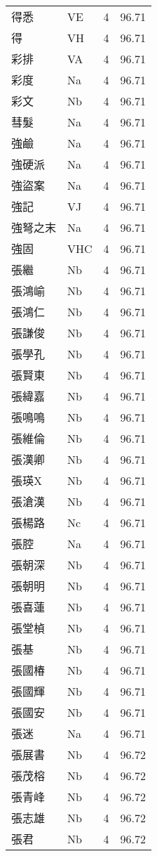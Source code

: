 \documentclass[twocolumn]{book}
\begin{document}
\begin{supertabular}{llrr}
得悉 & VE & 4 &  96.71\\
得 & VH & 4 &  96.71\\
彩排 & VA & 4 &  96.71\\
彩度 & Na & 4 &  96.71\\
彩文 & Nb & 4 &  96.71\\
彗髮 & Na & 4 &  96.71\\
強鹼 & Na & 4 &  96.71\\
強硬派 & Na & 4 &  96.71\\
強盜案 & Na & 4 &  96.71\\
強記 & VJ & 4 &  96.71\\
強弩之末 & Na & 4 &  96.71\\
強固 & VHC & 4 &  96.71\\
張繼 & Nb & 4 &  96.71\\
張鴻崳 & Nb & 4 &  96.71\\
張鴻仁 & Nb & 4 &  96.71\\
張謙俊 & Nb & 4 &  96.71\\
張學孔 & Nb & 4 &  96.71\\
張賢東 & Nb & 4 &  96.71\\
張緯嘉 & Nb & 4 &  96.71\\
張鳴鳴 & Nb & 4 &  96.71\\
張維倫 & Nb & 4 &  96.71\\
張漢卿 & Nb & 4 &  96.71\\
張瑛X & Nb & 4 &  96.71\\
張滄漢 & Nb & 4 &  96.71\\
張楊路 & Nc & 4 &  96.71\\
張腔 & Na & 4 &  96.71\\
張朝深 & Nb & 4 &  96.71\\
張朝明 & Nb & 4 &  96.71\\
張喜蓮 & Nb & 4 &  96.71\\
張堂楨 & Nb & 4 &  96.71\\
張基 & Nb & 4 &  96.71\\
張國椿 & Nb & 4 &  96.71\\
張國輝 & Nb & 4 &  96.71\\
張國安 & Nb & 4 &  96.71\\
張迷 & Na & 4 &  96.71\\
張展書 & Nb & 4 &  96.72\\
張茂榕 & Nb & 4 &  96.72\\
張青峰 & Nb & 4 &  96.72\\
張志雄 & Nb & 4 &  96.72\\
張君 & Nb & 4 &  96.72\\

\end{supertabular}
\end{document}
